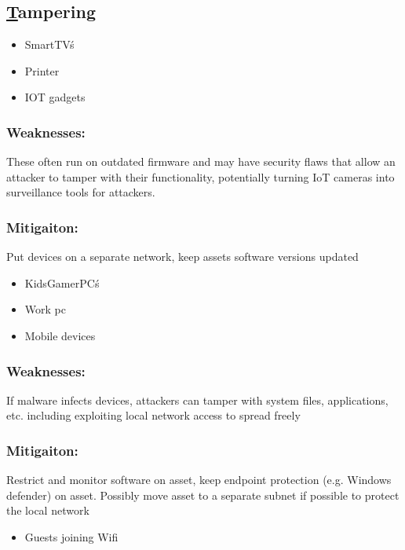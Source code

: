 \documentclass[
	letterpaper, %
	10pt, %
	unnumberedsections, %
	twoside, %
]{APAAssignment}
\begin{document}
\subsection{\underline{T}ampering}
\begin{singlespace}

	\begin{itemize}
		\item SmartTV\'s
		\item Printer 
		\item IOT gadgets 
	\end{itemize}
	
	\subsubsection{Weaknesses:} These often run on outdated firmware and may have security flaws that allow an attacker to tamper with their functionality, potentially turning IoT cameras into surveillance tools for attackers.
	\subsubsection{Mitigaiton:} Put devices on a separate network, keep assets software versions updated
	
	\begin{itemize}
		\item KidsGamerPC\'s
		\item Work pc
		\item Mobile devices
	\end{itemize}
	
	\subsubsection{Weaknesses:} If malware infects devices, attackers can tamper with system files, applications, etc. including exploiting local network access to spread freely
	\subsubsection{Mitigaiton:} Restrict and monitor software on asset, keep endpoint protection (e.g. Windows defender) on asset. Possibly move asset to a separate subnet if possible to protect the local network
	
	\begin{itemize}
		\item Guests joining Wifi
	\end{itemize}
	

\end{singlespace}
\end{document}

